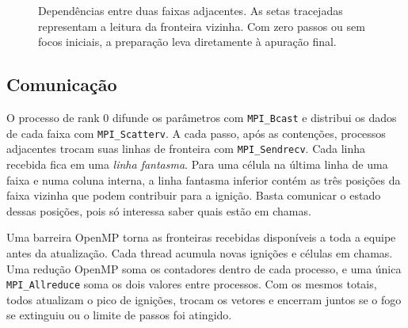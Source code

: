 \documentclass[11pt,a4paper]{article}
\begin{document}
\begin{figure}[ht]
\centering
{}
\caption{Dependências entre duas faixas adjacentes. As setas tracejadas
representam a leitura da fronteira vizinha. Com zero passos ou sem focos
iniciais, a preparação leva diretamente à apuração final.}
\end{figure}

\clearpage
\subsection{Comunicação}
O processo de rank 0 difunde os parâmetros com \texttt{MPI\_Bcast} e
distribui os dados de cada faixa com \texttt{MPI\_Scatterv}.
A cada passo, após as contenções, processos adjacentes trocam suas linhas
de fronteira com \texttt{MPI\_Sendrecv}. Cada linha recebida fica em uma
\emph{linha fantasma}. Para uma célula na última linha de uma faixa e numa
coluna interna, a linha fantasma inferior contém as três posições da faixa
vizinha que podem contribuir para a ignição. Basta comunicar o estado
dessas posições, pois só interessa saber quais estão em chamas.

Uma barreira OpenMP torna as fronteiras recebidas disponíveis a toda a
equipe antes da atualização. Cada thread acumula novas ignições e células
em chamas. Uma redução OpenMP soma os contadores dentro de cada processo,
e uma única \texttt{MPI\_Allreduce} soma os dois valores entre processos.
Com os mesmos totais, todos atualizam o pico de ignições, trocam os vetores
e encerram juntos se o fogo se extinguiu ou o limite de passos foi atingido.
\end{document}
